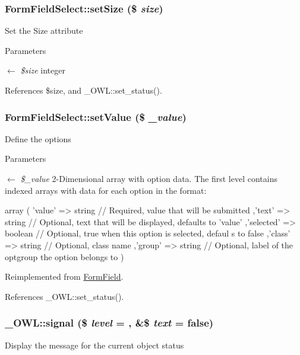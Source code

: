 \subsubsection[{setSize}]{\setlength{\rightskip}{0pt plus 5cm}FormFieldSelect::setSize (\$ {\em size})}\label{classFormFieldSelect_ad8ae8dcf6f6763cb32966eeca33c472b}
Set the Size attribute 
\begin{DoxyParams}{Parameters}
\item[\mbox{$\leftarrow$} {\em \$size}]integer \end{DoxyParams}


References \$size, and \_\-OWL::set\_\-status().

\subsubsection[{setValue}]{\setlength{\rightskip}{0pt plus 5cm}FormFieldSelect::setValue (\$ {\em \_\-value})}\label{classFormFieldSelect_ae69f5b352df63796c048dca6a2de7544}
Define the options 
\begin{DoxyParams}{Parameters}
\item[\mbox{$\leftarrow$} {\em \$\_\-value}]2-\/Dimensional array with option data. The first level contains indexed arrays with data for each option in the format: 
\begin{DoxyCode}
 array (
     'value'    => string  // Required, value that will be submitted
    ,'text'     => string  // Optional, text that will be displayed, defaults to 
      'value'
    ,'selected' => boolean // Optional, true when this option is selected, defaul
      s to false
    ,'class'    => string  // Optional, class name
    ,'group'    => string  // Optional, label of the optgroup the option belongs 
      to
 )
\end{DoxyCode}
 \end{DoxyParams}


Reimplemented from \hyperlink{classFormField_a465ff61e290d82be96bb793c3a14b3e7}{FormField}.



References \_\-OWL::set\_\-status().

\subsubsection[{signal}]{\setlength{\rightskip}{0pt plus 5cm}\_\-OWL::signal (\$ {\em level} = {}, \/  \&\$ {\em text} = {\ttfamily false})}\label{class__OWL_a51ba4a16409acf2a2f61f286939091a5}
Display the message for the current object status


